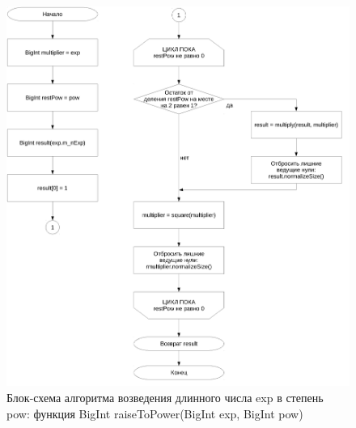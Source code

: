 \documentclass[a4paper,12pt]{article} %
\begin{document}
\begin{figure}[ht]
	\centering
	\includegraphics[width=\textwidth]{lr3_raiseToPower.pdf}
	\caption{Блок-схема алгоритма возведения длинного числа exp в степень pow: функция BigInt raiseToPower(BigInt exp, BigInt pow)}
\end{figure}
\end{document}
